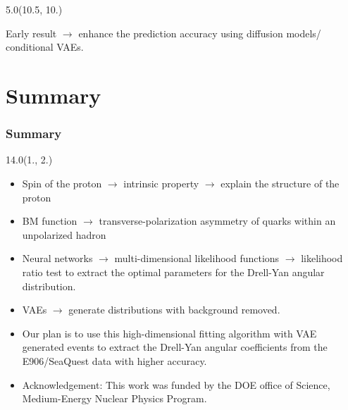 \documentclass[12pt, xcolor={dvipsnames}, aspectratio = 169, sans,mathserif]{beamer}
\newenvironment{List}[2]
{\begin{textblock}{#1}#2
\begin{itemize}}
{\end{itemize}
\end{textblock}}
\begin{document}
\begin{frame}
\begin{textblock}{5.0}(10.5, 10.)

Early result $\rightarrow$ enhance the prediction accuracy using diffusion models/ conditional VAEs.

\end{textblock}

\end{frame}

\section{Summary}

\begin{frame}
\frametitle{Summary}

\begin{List}{14.0}{(1., 2.)}

    \item Spin of the proton $\rightarrow$ intrinsic property $\rightarrow$ explain the structure of the proton

    \item BM function $\rightarrow$ transverse-polarization asymmetry of quarks within an unpolarized hadron

    \item Neural networks $\rightarrow$ multi-dimensional likelihood functions $\rightarrow$ likelihood ratio test to extract the optimal parameters for the Drell-Yan angular distribution.

    \item VAEs $\rightarrow$ generate distributions with background removed.

    \item Our plan is to use this high-dimensional fitting algorithm with VAE generated events to extract the Drell-Yan angular coeﬀicients from the E906/SeaQuest data with higher accuracy.

    \item Acknowledgement: This work was funded by the DOE office of Science, Medium-Energy Nuclear Physics Program.

\end{List}
\end{frame}
\end{document}

